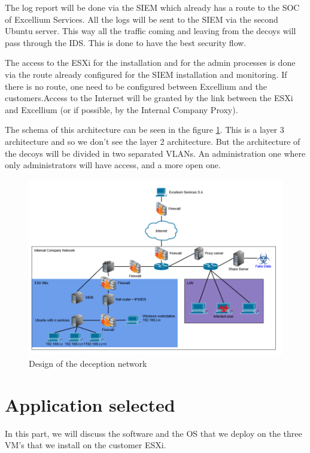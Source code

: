 \documentclass{tnreport}
\begin{document}
The log report will be done via the \gls{SIEM} which already has a route to the \gls{SOC} of \gls{Excellium} Services. All the logs will be sent to the \gls{SIEM} via the second Ubuntu server. This way all the traffic coming and leaving from the decoys will pass through the \gls{IDS}. This is done to have the best security flow. 

The access to the ESXi for the installation and for the admin processes is done via the route already configured for the \gls{SIEM} installation and monitoring. If there is no route, one need to be configured between \gls{Excellium} and the customers.\eol Access to the Internet will be granted by the link between the ESXi and \gls{Excellium} (or if possible, by the Internal Company Proxy).

The schema of this architecture can be seen in the figure \ref{fig:network}. This is a layer 3 architecture and so we don't see the layer 2 architecture. But the architecture of the decoys will be divided in two separated VLANs. An administration one where only administrators will have access, and a more open one.

\begin{figure}[h!]
  \begin{center}
  \includegraphics[width=\linewidth]{figures/network}
  \caption{Design of the deception network}
  \label{fig:network}
  \end{center}
\end{figure}



\section{Application selected}
In this part, we will discuss the software and the OS that we deploy on the three VM's that we install on the customer ESXi.
\end{document}
